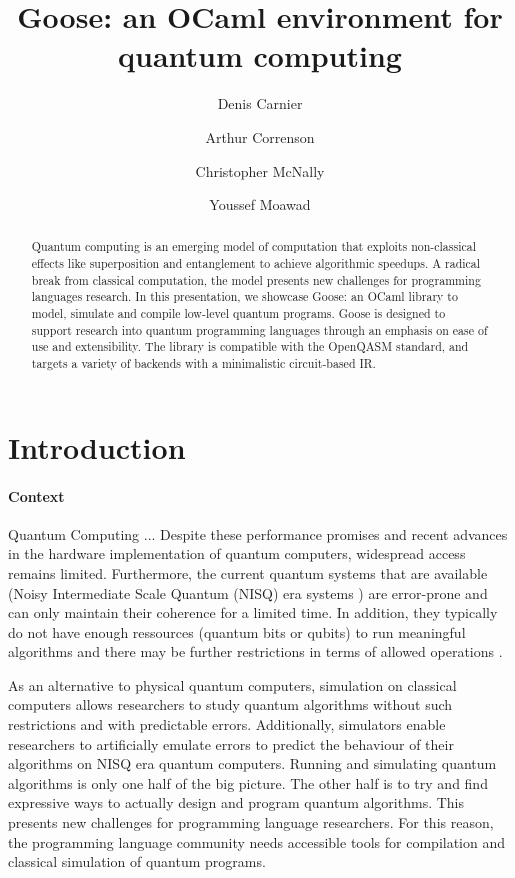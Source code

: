 \documentclass[a4paper]{easychair}
\title{Goose: an OCaml environment for quantum computing}
\author{
  Denis Carnier\inst{1}
  \and
  Arthur Correnson\inst{2}
  \and
  Christopher McNally\inst{3}
  \and
  Youssef Moawad\inst{4}
}
\institute{
  imec-DistriNet, KU Leuven
\and
  Ecole Normale Sup\'erieure de Rennes
\and
  Massachusetts Institute of Technology
\and
  University of Glasgow
}
\begin{document}
\maketitle

\begin{abstract}
Quantum computing is an emerging model of computation that exploits non-classical effects like superposition and entanglement to achieve algorithmic speedups. A radical break from classical computation, the model presents new challenges for programming languages research. In this presentation, we showcase Goose: an OCaml library to model, simulate and compile low-level quantum programs. Goose is designed to support research into quantum programming languages through an emphasis on ease of use and extensibility. The library is compatible with the OpenQASM standard, and targets a variety of backends with a minimalistic circuit-based IR.
\end{abstract}

\section{Introduction}

\paragraph*{Context}

Quantum Computing \cite{Chuang2010} ...  Despite these performance promises and recent advances in the hardware implementation of quantum computers, widespread access remains limited. Furthermore, the current quantum systems that are available (Noisy Intermediate Scale Quantum (NISQ) era systems \cite{Preskill2018}) are error-prone and can only maintain their coherence for a limited time. In addition, they typically do not have enough ressources (quantum bits or qubits) to run meaningful algorithms and there may be further restrictions in terms of allowed operations \cite{Gyongyosi2019}.

As an alternative to physical quantum computers, simulation on classical computers allows researchers to study quantum algorithms without such restrictions and with predictable errors. Additionally, simulators enable researchers to artificially emulate errors to predict the behaviour of their algorithms on NISQ era quantum computers. Running and simulating quantum algorithms is only one half of the big picture. The other half is to try and find expressive ways to actually design and program quantum algorithms. This presents new challenges for programming language researchers. For this reason, the programming language community needs accessible tools for compilation and classical simulation of quantum programs.
\end{document}
